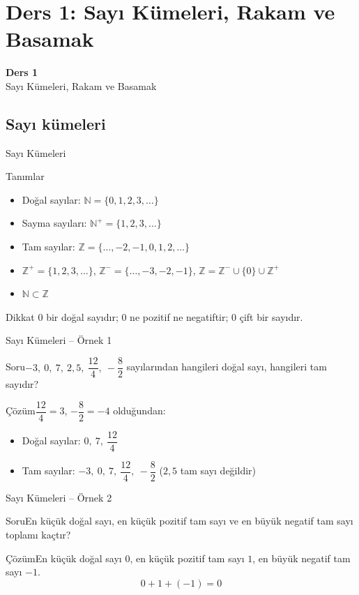 \documentclass[aspectratio=169,11pt]{beamer}
\newcommand{\soru}[3]{%
\begin{frame}{#1}
  \begin{block}{Soru}\large #2\end{block}
  \pause
  \begin{exampleblock}{Çözüm}\large #3\end{exampleblock}
\end{frame}}
\begin{document}
\section{Ders 1: Sayı Kümeleri, Rakam ve Basamak}
\begin{frame}
\centering\Large\color{anamavi}\textbf{Ders 1}\\[6pt]\normalsize Sayı Kümeleri, Rakam ve Basamak
\end{frame}

\subsection{Sayı kümeleri}
\begin{frame}{Sayı Kümeleri}
\begin{block}{Tanımlar}
\begin{itemize}
\item Doğal sayılar: \(\mathbb{N}=\{0,1,2,3,\dots\}\)
\item Sayma sayıları: \(\mathbb{N}^{+}=\{1,2,3,\dots\}\)
\item Tam sayılar: \(\mathbb{Z}=\{\dots,-2,-1,0,1,2,\dots\}\)
\item \(\mathbb{Z}^{+}=\{1,2,3,\dots\}\), \quad \(\mathbb{Z}^{-}=\{\dots,-3,-2,-1\}\), \quad \(\mathbb{Z}=\mathbb{Z}^{-}\cup\{0\}\cup\mathbb{Z}^{+}\)
\item \(\mathbb{N}\subset\mathbb{Z}\)
\end{itemize}
\end{block}
\begin{alertblock}{Dikkat}
\(0\) bir doğal sayıdır; \(0\) ne pozitif ne negatiftir; \(0\) çift bir sayıdır.
\end{alertblock}
\end{frame}

\soru{Sayı Kümeleri -- Örnek 1}
{\(-3,\ 0,\ 7,\ 2{,}5,\ \dfrac{12}{4},\ -\dfrac{8}{2}\) sayılarından hangileri doğal sayı, hangileri tam sayıdır?}
{\(\dfrac{12}{4}=3\), \(-\dfrac{8}{2}=-4\) olduğundan:
\begin{itemize}
\item Doğal sayılar: \(0,\ 7,\ \dfrac{12}{4}\)
\item Tam sayılar: \(-3,\ 0,\ 7,\ \dfrac{12}{4},\ -\dfrac{8}{2}\) \quad (\(2{,}5\) tam sayı değildir)
\end{itemize}}

\soru{Sayı Kümeleri -- Örnek 2}
{En küçük doğal sayı, en küçük pozitif tam sayı ve en büyük negatif tam sayı toplamı kaçtır?}
{En küçük doğal sayı \(0\), en küçük pozitif tam sayı \(1\), en büyük negatif tam sayı \(-1\).
\[0+1+(-1)=0\]}
\end{document}
